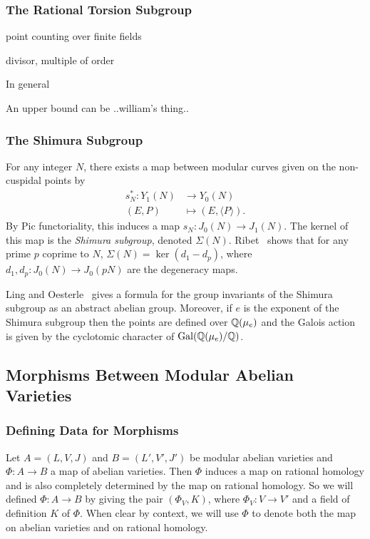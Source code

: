 \documentclass{article}
\begin{document}
\subsubsection{The Rational Torsion Subgroup}

point counting over finite fields

divisor, multiple of order


In general

An upper bound can be
..william's thing..

\subsubsection{The Shimura Subgroup}

For any integer $N$, there exists a map between modular curves given
on the non-cuspidal points by
\begin{align*}
	s_N ^*: Y_1(N) & \to Y_0(N)                      \\
	(E, P)         & \mapsto (E, \langle P \rangle).
\end{align*}
By Pic functoriality, this induces a map $s_N: J_0(N)\to J_1(N)$. The kernel of
this map is the \emph{Shimura subgroup}, denoted $\Sigma(N)$.
Ribet~\cite[Theorem 4.3]{ribet:congrel} shows that for any prime $p$ coprime to
$N$, $\Sigma(N)=\ker(d_1 - d_p)$, where $d_1,d_p :J_0(N)\to J_0(pN)$ are the
degeneracy maps.

Ling and Oesterle~\cite[Theorem 1,2]{MR1141458} gives a formula for the group
invariants of the Shimura subgroup as an abstract abelian group. Moreover, if
$e$ is the exponent of the Shimura subgroup then the points are defined over
$\mathbb{Q}(\mu_e)$ and the Galois action is given by the cyclotomic character of
$\operatorname{Gal}(\mathbb{Q}(\mu_e)/\mathbb{Q})$.

\subsection{Morphisms Between Modular Abelian Varieties}



\subsubsection{Defining Data for Morphisms}

Let $A=(L, V, J)$ and $B=(L', V', J')$ be modular abelian varieties and
$\Phi:A\to B$ a map of abelian varieties. Then $\Phi$ induces a map on rational
homology and is also completely determined by the map on rational homology.
So we will defined $\Phi:A\to B$ by giving the pair $(\Phi_V, K)$, where
$\Phi_V:V\to V'$ and a field of definition $K$ of $\Phi$. When clear by
context, we will use $\Phi$ to denote both the map on abelian varieties and on
rational homology.
\end{document}
